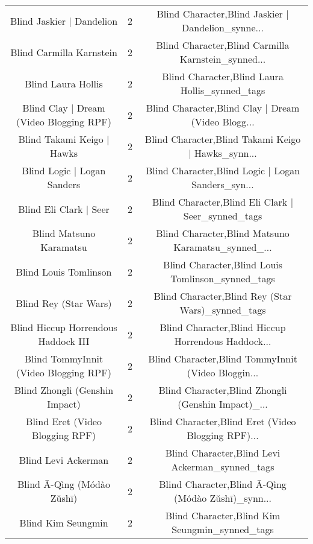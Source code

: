 \begin{table}[h!]
{\begin{tabular}{|c|c|c|}
                         Blind Jaskier | Dandelion &          2 & Blind Character,Blind Jaskier | Dandelion\_synne... \\
                          Blind Carmilla Karnstein &          2 & Blind Character,Blind Carmilla Karnstein\_synned... \\
                                Blind Laura Hollis &          2 &     Blind Character,Blind Laura Hollis\_synned\_tags \\
           Blind Clay | Dream (Video Blogging RPF) &          2 & Blind Character,Blind Clay | Dream (Video Blogg... \\
                        Blind Takami Keigo | Hawks &          2 & Blind Character,Blind Takami Keigo | Hawks\_synn... \\
                       Blind Logic | Logan Sanders &          2 & Blind Character,Blind Logic | Logan Sanders\_syn... \\
                            Blind Eli Clark | Seer &          2 & Blind Character,Blind Eli Clark | Seer\_synned\_tags \\
                           Blind Matsuno Karamatsu &          2 & Blind Character,Blind Matsuno Karamatsu\_synned\_... \\
                             Blind Louis Tomlinson &          2 &  Blind Character,Blind Louis Tomlinson\_synned\_tags \\
                             Blind Rey (Star Wars) &          2 &  Blind Character,Blind Rey (Star Wars)\_synned\_tags \\
               Blind Hiccup Horrendous Haddock III &          2 & Blind Character,Blind Hiccup Horrendous Haddock... \\
             Blind TommyInnit (Video Blogging RPF) &          2 & Blind Character,Blind TommyInnit (Video Bloggin... \\
                    Blind Zhongli (Genshin Impact) &          2 & Blind Character,Blind Zhongli (Genshin Impact)\_... \\
                   Blind Eret (Video Blogging RPF) &          2 & Blind Character,Blind Eret (Video Blogging RPF)... \\
                               Blind Levi Ackerman &          2 &    Blind Character,Blind Levi Ackerman\_synned\_tags \\
                        Blind Ā-Qìng (Módào Zǔshī) &          2 & Blind Character,Blind Ā-Qìng (Módào Zǔshī)\_synn... \\
                                Blind Kim Seungmin &          2 &     Blind Character,Blind Kim Seungmin\_synned\_tags \\

\end{tabular}}
\end{table}
